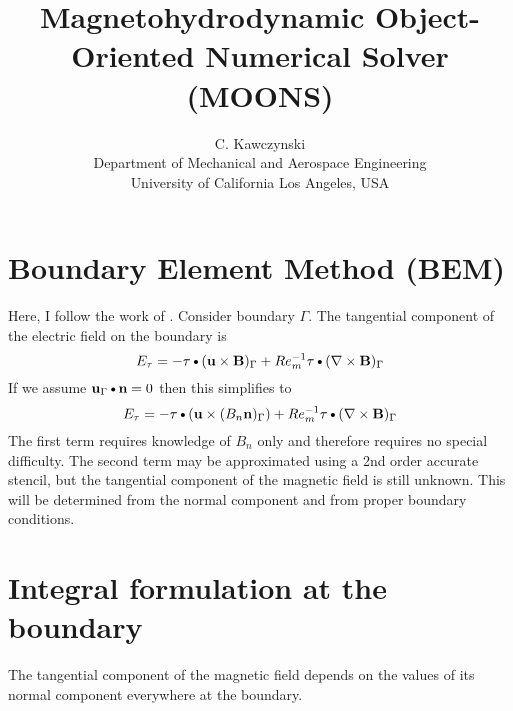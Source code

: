 \documentclass[11pt]{article}
\newcommand{\DOT}{\text{\textbullet}}
\begin{document}
\doublespacing
\title{Magnetohydrodynamic Object-Oriented Numerical Solver (MOONS)}
\author{C. Kawczynski \\
Department of Mechanical and Aerospace Engineering \\
University of California Los Angeles, USA\\
}

\section{Boundary Element Method (BEM)}
Here, I follow the work of \cite{Iskakov2004}. Consider boundary $\Gamma$. The tangential component of the electric field on the boundary is
\begin{equation}
  E_{\tau} = -\mathbf{\tau} \DOT (\mathbf{u} \times \mathbf{B})_{\Gamma} + 
  Re_m^{-1} \mathbf{\tau} \DOT (\nabla \times \mathbf{B})_{\Gamma}
\end{equation}
If we assume $\mathbf{u}_{\Gamma} \DOT \mathbf{n} = 0$ then this simplifies to
\begin{equation}
  E_{\tau} = -\mathbf{\tau} \DOT (\mathbf{u} \times (B_n \mathbf{n})_{\Gamma}) + 
  Re_m^{-1} \mathbf{\tau} \DOT (\nabla \times \mathbf{B})_{\Gamma}
\end{equation}
The first term requires knowledge of $B_n$ only and therefore requires no special difficulty. The second term may be approximated using a 2nd order accurate stencil, but the tangential component of the magnetic field is still unknown. This will be determined from the normal component and from proper boundary conditions.
\section{Integral formulation at the boundary}
The tangential component of the magnetic field depends on the values of its normal component everywhere at the boundary.
\end{document}
